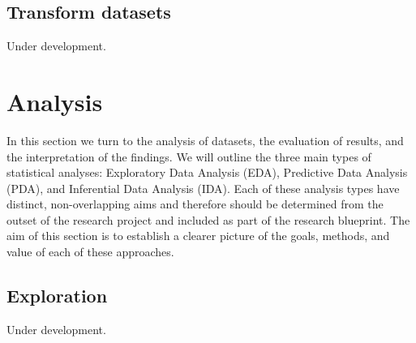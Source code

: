 \documentclass[
  letterpaper,
  DIV=11,
  numbers=noendperiod]{scrreport}
\theoremstyle{definition}
\theoremstyle{remark}
\begin{document}
\hypertarget{sec-transform-datasets}{%
\chapter{Transform datasets}\label{sec-transform-datasets}}

\begin{tcolorbox}[enhanced jigsaw, breakable, arc=.35mm, rightrule=.15mm, coltitle=black, title=\textcolor{quarto-callout-caution-color}{\faFire}\hspace{0.5em}{Caution}, bottomtitle=1mm, leftrule=.75mm, toptitle=1mm, titlerule=0mm, opacitybacktitle=0.6, toprule=.15mm, colback=white, colframe=quarto-callout-caution-color-frame, left=2mm, bottomrule=.15mm, opacityback=0, colbacktitle=quarto-callout-caution-color!10!white]

Under development.

\end{tcolorbox}

\part{Analysis}

In this section we turn to the analysis of datasets, the evaluation of
results, and the interpretation of the findings. We will outline the
three main types of statistical analyses: Exploratory Data Analysis
(EDA), Predictive Data Analysis (PDA), and Inferential Data Analysis
(IDA). Each of these analysis types have distinct, non-overlapping aims
and therefore should be determined from the outset of the research
project and included as part of the research blueprint. The aim of this
section is to establish a clearer picture of the goals, methods, and
value of each of these approaches.

\hypertarget{sec-exploration}{%
\chapter{Exploration}\label{sec-exploration}}

\begin{tcolorbox}[enhanced jigsaw, breakable, arc=.35mm, rightrule=.15mm, coltitle=black, title=\textcolor{quarto-callout-caution-color}{\faFire}\hspace{0.5em}{Caution}, bottomtitle=1mm, leftrule=.75mm, toptitle=1mm, titlerule=0mm, opacitybacktitle=0.6, toprule=.15mm, colback=white, colframe=quarto-callout-caution-color-frame, left=2mm, bottomrule=.15mm, opacityback=0, colbacktitle=quarto-callout-caution-color!10!white]

Under development.

\end{tcolorbox}
\end{document}
